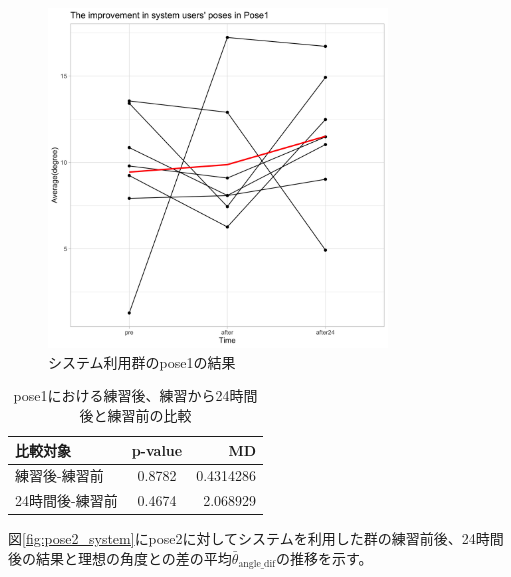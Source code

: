       \begin{figure}[H]
        \begin{center}
        \includegraphics[width=9cm]{figures/pose1_system_true_graph.png}
        \caption{システム利用群のpose1の結果}
        \label{fig:pose1_system}
        \end{center}
      \end{figure}

      \begin{table}[h]
        \centering
        \caption{pose1における練習後、練習から24時間後と練習前の比較}
        \begin{tabular}{lcr}
        \hline
        \textbf{比較対象} & \textbf{p-value} & \textbf{MD} \\ \hline
        練習後-練習前 & 0.8782 & 0.4314286 \\ \hline
        24時間後-練習前 & 0.4674 & 2.068929 \\ \hline
        \end{tabular}
        \label{table:pose1_system_p_value}
        \end{table}

        図\ref{fig:pose2_system}にpose2に対してシステムを利用した群の練習前後、24時間後の結果と理想の角度との差の平均\(\bar{\theta}_{\text{angle\_dif}}\)の推移を示す。


